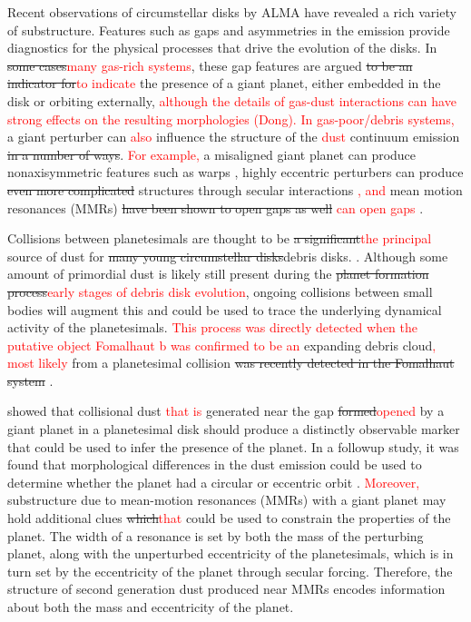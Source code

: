 \documentclass[twocolumn]{aastex63}
\newcommand{\ACBc}[1]{\textcolor{red}{#1}}
\begin{document}
Recent observations of circumstellar disks by ALMA have revealed a rich variety of substructure. Features 
such as gaps and asymmetries 
\citep{2015ApJ...808L...3A, 2016Sci...353.1519P, PhysRevLett.117.251101, 2016ApJ...820L..40A, 2016Natur.535..258C} in the emission provide 
diagnostics for the physical processes that drive the evolution of the disks. In \sout{some cases}\ACBc{many gas-rich systems}, these gap features are argued \sout{to be an indicator for}\ACBc{to indicate} the
presence of a giant planet, either embedded in the disk \citep{2015MNRAS.453L..73D} or orbiting externally, \ACBc{although the details of gas-dust interactions can have strong effects on the resulting morphologies (Dong).}
\ACBc{In gas-poor/debris systems,} a giant perturber can \ACBc{also} influence the 
structure of the \ACBc{dust} continuum emission \sout{ in a number of ways}. \ACBc{For example,} a misaligned giant planet can produce nonaxisymmetric features such as warps 
\citep{2001A&A...370..447A}, highly eccentric perturbers can produce \sout{even more complicated} structures through secular interactions 
\citep{2014MNRAS.443.2541P, 2015MNRAS.448.3679P}\ACBc{, and} mean motion resonances (MMRs) \sout{have been shown to open gaps as well }\ACBc{can open gaps}
\citep{2015ApJ...798...83N, 2016ApJ...818..159T, 2018ApJ...857....3T}.

Collisions between planetesimals are thought to be \sout{a significant}\ACBc{the principal} source of dust for \sout{many young circumstellar disks}{debris disks}. 
\citep[see][]{2008ARA&A..46..339W}.  Although some amount of primordial dust is likely still present during the \sout{planet formation process}\ACBc{early stages of debris disk evolution}, 
ongoing collisions between small bodies will augment this and could be used to trace the underlying dynamical activity of the planetesimals. 
\ACBc{This process was directly detected when the putative object Fomalhaut b was confirmed to be an} expanding debris cloud\ACBc{, most likely} from a planetesimal collision \sout{was recently detected in the 
Fomalhaut system} \citep{2020PNAS..117.9712G}. 

\citet{2013ApJ...777L..31D} showed that collisional dust \ACBc{that is} generated near the gap \sout{formed}\ACBc{opened} by a giant planet in a planetesimal disk should produce a 
distinctly observable marker that could be used to infer the presence of the planet. In a followup study, it was found that morphological differences in 
the dust emission could be used to determine whether the planet had a circular or eccentric orbit \citep{2016ApJ...820...29D}.
\ACBc{Moreover,} substructure due to mean-motion resonances (MMRs) with a giant planet may hold additional clues \sout{which}\ACBc{that} 
could be used to constrain the properties of the planet.  The width of a resonance is set by both the mass of the perturbing planet, along with the 
unperturbed eccentricity of the planetesimals, which is in turn set by the eccentricity of the planet through secular forcing. Therefore, the structure of 
second generation dust produced near MMRs encodes information about both the mass and eccentricity of the planet.
\end{document}
